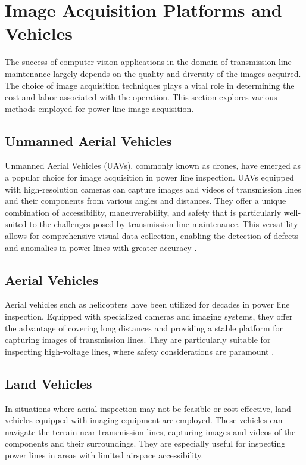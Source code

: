 \section{Image Acquisition Platforms and Vehicles}\label{sec:image_acquisition}
The success of computer vision applications in the domain of transmission line maintenance largely depends on the quality and diversity of the images acquired. The choice of image acquisition techniques plays a vital role in determining the cost and labor associated with the operation. This section explores various methods employed for power line image acquisition.

\subsection{Unmanned Aerial Vehicles}
Unmanned Aerial Vehicles (UAVs), commonly known as drones, have emerged as a popular choice for image acquisition in power line inspection. UAVs equipped with high-resolution cameras can capture images and videos of transmission lines and their components from various angles and distances. They offer a unique combination of accessibility, maneuverability, and safety that is particularly well-suited to the challenges posed by transmission line maintenance. This versatility allows for comprehensive visual data collection, enabling the detection of defects and anomalies in power lines with greater accuracy \cite{zhang_automatic_2017}.

\subsection{Aerial Vehicles}
Aerial vehicles such as helicopters have been utilized for decades in power line inspection. Equipped with specialized cameras and imaging systems, they offer the advantage of covering long distances and providing a stable platform for capturing images of transmission lines. They are particularly suitable for inspecting high-voltage lines, where safety considerations are paramount \cite{yang_review_2020}.

\subsection{Land Vehicles}
In situations where aerial inspection may not be feasible or cost-effective, land vehicles equipped with imaging equipment are employed. These vehicles can navigate the terrain near transmission lines, capturing images and videos of the components and their surroundings. They are especially useful for inspecting power lines in areas with limited airspace accessibility.

